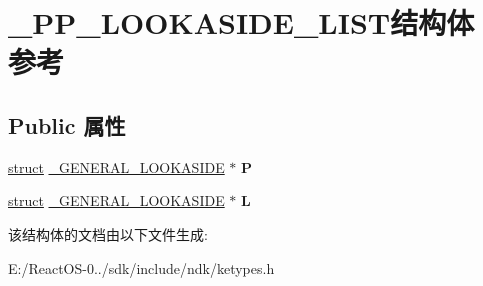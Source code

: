 \hypertarget{struct___p_p___l_o_o_k_a_s_i_d_e___l_i_s_t}{}\section{\+\_\+\+P\+P\+\_\+\+L\+O\+O\+K\+A\+S\+I\+D\+E\+\_\+\+L\+I\+S\+T结构体 参考}
\label{struct___p_p___l_o_o_k_a_s_i_d_e___l_i_s_t}
\subsection*{Public 属性}
\begin{DoxyCompactItemize}
\item 
\mbox{\label{struct___p_p___l_o_o_k_a_s_i_d_e___l_i_s_t_a666736149aadf48ff11442dc666ed7d9}} 
\hyperlink{interfacestruct}{struct} \hyperlink{struct___g_e_n_e_r_a_l___l_o_o_k_a_s_i_d_e}{\+\_\+\+G\+E\+N\+E\+R\+A\+L\+\_\+\+L\+O\+O\+K\+A\+S\+I\+DE} $\ast$ {\bfseries P}
\item 
\mbox{\label{struct___p_p___l_o_o_k_a_s_i_d_e___l_i_s_t_a6a537f6bfafd432016dad387cb906574}} 
\hyperlink{interfacestruct}{struct} \hyperlink{struct___g_e_n_e_r_a_l___l_o_o_k_a_s_i_d_e}{\+\_\+\+G\+E\+N\+E\+R\+A\+L\+\_\+\+L\+O\+O\+K\+A\+S\+I\+DE} $\ast$ {\bfseries L}
\end{DoxyCompactItemize}


该结构体的文档由以下文件生成\+:\begin{DoxyCompactItemize}
\item 
E\+:/\+React\+O\+S-\/0../sdk/include/ndk/ketypes.\+h\end{DoxyCompactItemize}
